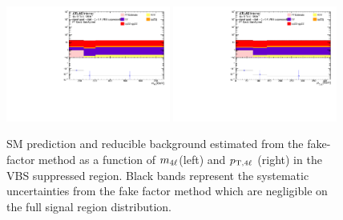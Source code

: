 \begin{figure}[htb]
	\centering
	\includegraphics[width=0.48\textwidth]{figures/Analysis/Background/RedStack_VBSSuppressed_M4l.pdf}
	\includegraphics[width=0.48\textwidth]{figures/Analysis/Background/RedStack_VBSSuppressed_Pt4l.pdf}
	\caption{ SM prediction and reducible background estimated from the fake-factor method as a function of $m_{4\ell}$(left) and $p_{\textrm{T} ,4\ell}$ (right) in the VBS suppressed region. Black bands represent the systematic uncertainties from the fake factor method which are negligible on the full signal region distribution. \label{fig:MCFFRedStack_VBSSup} }
\end{figure}